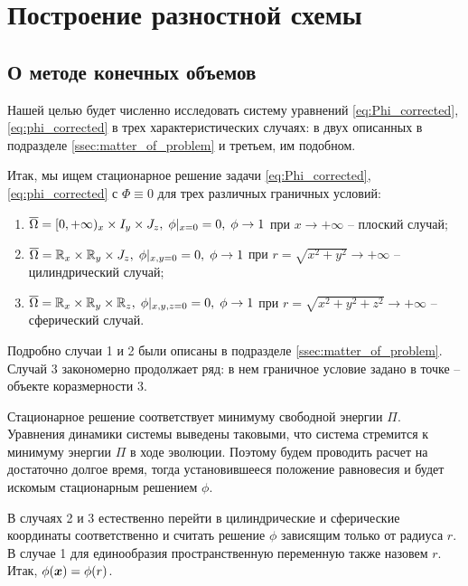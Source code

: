 
\section{Построение разностной схемы}

\subsection{О методе конечных объемов}

Нашей целью будет численно исследовать систему уравнений \eqref{eq:Phi_corrected}, \eqref{eq:phi_corrected} в трех характеристических случаях: в двух описанных в подразделе \ref{ssec:matter_of_problem} и третьем, им подобном.

Итак, мы ищем стационарное решение задачи \eqref{eq:Phi_corrected}, \eqref{eq:phi_corrected} с $\Phi \equiv 0$ для трех различных граничных условий:
\begin{enumerate}
    \item ${\overline{\Omega}} = [0, +\infty)_x \times I_y \times J_z, \; \phi|_{x = 0} = 0, \; \phi \to 1$ при $x \to +\infty$ -- плоский случай;
    \item ${\overline{\Omega}} = {\mathbb{R}}_x \times {\mathbb{R}}_y \times J_z, \; \phi|_{x, y = 0} = 0, \; \phi \to 1$ при $r = \sqrt{x^2 + y^2} \to +\infty$ -- цилиндрический случай;
    \item ${\overline{\Omega}} = {\mathbb{R}}_x \times {\mathbb{R}}_y \times {\mathbb{R}}_z, \; \phi|_{x, y, z = 0} = 0, \; \phi \to 1$ при $r = \sqrt{x^2 + y^2 + z^2} \to +\infty$ -- сферический случай.
\end{enumerate}
Подробно случаи 1 и 2 были описаны в подразделе \ref{ssec:matter_of_problem}. Случай 3 закономерно продолжает ряд: в нем граничное условие задано в точке -- объекте коразмерности 3.

Стационарное решение соответствует минимуму свободной энергии $\Pi$. \linebreak Уравнения динамики системы выведены таковыми, что система стремится к минимуму энергии $\Pi$ в ходе эволюции. Поэтому будем проводить расчет на достаточно долгое время, тогда установившееся положение равновесия и будет искомым стационарным решением $\phi$.

В случаях 2 и 3 естественно перейти в цилиндрические и сферические координаты соответственно и считать решение $\phi$ зависящим только от радиуса $r$. В случае 1 для единообразия пространственную переменную также назовем $r$. Итак, $\phi({\boldsymbol{x}}) = \phi(r)$.

